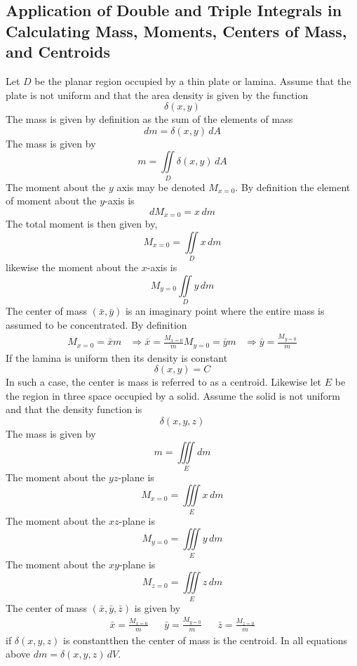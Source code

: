 \documentclass[14pt]{article}
\begin{document}
    \subsection{Application of Double and Triple Integrals in Calculating Mass, Moments, Centers of Mass, and Centroids}
    Let $D$ be the planar region occupied by a thin plate or lamina. Assume that the plate is not uniform and that the area density is given by the function
    $$\delta(x,y)$$
    The mass is given by definition as the sum of the elements of mass
    $$dm=\delta(x,y)\, dA$$
    The mass is given by 
    $$m=\iint\limits_D\delta(x,y)\, dA$$
    The moment about the $y$ axis may be denoted $M_{x=0}$. By definition the element of moment about the $y$-axis is
    $$dM_{x=0}=x\, dm$$
    The total moment is then given by,
    $$M_{x=0}=\iint\limits_D x\, dm$$
    likewise the moment about the $x$-axis is 
    $$M_{y=0}\iint\limits_D y\, dm$$
    The center of mass $(\bar x, \bar y)$ is an imaginary point where the entire mass is assumed to be concentrated. By definition
    \begin{align*}
        M_{x=0}=\bar x m&\Rightarrow\bar x=\frac{M_{x=0}}{m}
        M_{y=0}=\bar y m&\Rightarrow\bar y=\frac{M_{y=0}}{m}
    \end{align*} 
    If the lamina is uniform then its density is constant\footnotemark[2]
    $$\delta(x,y)=C$$
    In such a case, the center is mass is referred to as a centroid. Likewise let $E$ be the region in three space occupied by a solid. Assume the solid is not uniform and that the density function is
    $$\delta(x,y,z)$$
    The mass is given by
    $$m=\iiint\limits_E dm$$
    The moment about the $yz$-plane is
    $$M_{x=0}=\iiint\limits_E x\, dm$$
    The moment about the $xz$-plane is
    $$M_{y=0}=\iiint\limits_E y\, dm$$
    The moment about the $xy$-plane is
    $$M_{z=0}=\iiint\limits_E z\, dm$$
    The center of mass $(\bar x, \bar y, \bar z)$ is given by
    \begin{align*}
        \bar x=\frac{M_{x=0}}{m}&&\bar y=\frac{M_{y=0}}{m}&&\bar z=\frac{M_{z=0}}{m}
    \end{align*}
    if $\delta(x,y,z)$ is constant\footnotemark[2] then the center of mass is the centroid. In all equations above $dm=\delta(x,y,z)\, dV$. 
\end{document}
